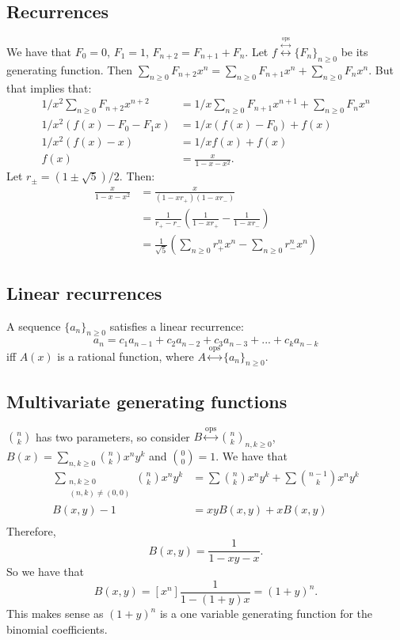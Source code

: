 \documentclass[]{article}
\theoremstyle{definition}
\numberwithin{theorem}{section}
\numberwithin{equation}{section}
\newcommand{\ops}{\overset{\text{ops}}{\leftrightarrow}}
\begin{document}
\subsection{Recurrences}
We have that $F_0 = 0$, $F_1 = 1$, $F_{n+2} = F_{n+1} + F_n$. 
Let $f \overset{\ops}{\leftrightarrow} \lbrace F_n \rbrace_{n \geq 0} $ be its generating function. Then $\sum_{n \geq 0}F_{n+2} x^n = \sum_{n \geq 0} F_{n+1} x^n + \sum_{n \geq 0}F_n x^n$.
But that implies that:
\begin{align*}
	1/x^2 \sum_{n \geq 0}F_{n+2} x^{n+2} &= 1/x\sum_{n \geq 0} F_{n+1} x^{n+1} + \sum_{n \geq 0}F_n x^n\\
	1/x^2(f(x) - F_0 - F_1 x) &= 1/x(f(x) - F_0) + f(x)\\
	1/x^2(f(x) - x) &= 1/x f(x) + f(x)\\
	f(x) &= \frac{x}{1-x-x^2}.
\end{align*}
Let $r_\pm = (1 \pm \sqrt{5})/2$. Then:
\begin{align*}
	\frac{x}{1-x-x^2} &= \frac{x}{(1-xr_+)(1-xr_-)}\\
	&= \frac{1}{r_+ - r_-}\left(\frac{1}{1 - xr_+}- \frac{1}{1-x r_-}\right)\\
	&= \frac{1}{\sqrt{5}} \left(\sum_{n \geq 0}r_+^n x^n -\sum_{n \geq 0}r_-^n x^n  \right)
\end{align*}
\subsection{Linear recurrences}
A sequence $\lbrace a_n \rbrace_{n \geq 0}$ satisfies a linear recurrence:
\begin{equation}
	a_n = c_1 a_{n-1} + c_2 a_{n-2} + c_3a_{n-3} + ... + c_ka_{n-k}
\end{equation}
iff $A(x)$ is a rational function, where $A \ops \lbrace a_n \rbrace_{n \geq 0}$.

\subsection{Multivariate generating functions}
$\binom{n}{k}$ has two parameters, so consider $B \ops {\binom{n}{k}}_{n, k\geq 0}$, $B(x) = \sum_{n,k \geq 0}\binom{n}{k} x^n y^k$ and $\binom{0}{0} = 1$. 
We have that \begin{align*}
	\sum_{\substack{
		n,k \geq 0\\
		(n,k) \neq (0,0)
}}
\binom{n}{k} x^n y^k &= \sum \binom{n}{k}x^n y^k + \sum \binom{n-1}{k} x^n y^k\\
B(x,y) - 1 &= xyB(x,y) + xB(x,y)\\
\end{align*}
Therefore,
\begin{equation}
	B(x,y) = \frac{1}{1-xy-x}.
\end{equation}
So we have that 
\begin{equation}
	[x^n]B(x,y) = [x^n]\frac{1}{1-(1+y) x} = (1 + y)^n.
\end{equation}
This makes sense as $(1 + y)^n$ is a one variable generating function for the binomial coefficients.
\end{document}
